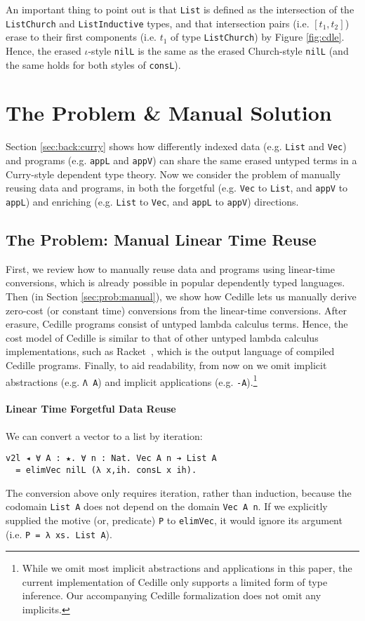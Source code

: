 \documentclass[acmsmall]{acmart}\settopmatter{}
\newcommand{\refsec}[1]{Section \ref{sec:#1}}
\newcommand{\labsec}[1]{\label{sec:#1}}
\newcommand{\reffig}[1]{Figure \ref{fig:#1}}
\begin{document}
An important thing to point out is that \verb;List; is
defined as the intersection of the \verb;ListChurch; and
\verb;ListInductive; types, and that intersection pairs (i.e. $[t_1,t_2]$) erase to their
first components (i.e. $t_1$ of type \verb;ListChurch;) by \reffig{cdle}.
Hence, the erased $\iota$-style \verb;nilL; is the same as the erased
Church-style \verb;nilL; (and the same holds for both styles of
\verb;consL;).

\section{The Problem \& Manual Solution}
\labsec{prob}

\refsec{back:curry} shows how differently indexed data
(e.g. \verb;List; and \verb;Vec;) and programs
(e.g. \verb;appL; and \verb;appV;) can share the same erased
untyped terms in a Curry-style dependent type theory. 
Now we consider the problem of manually reusing data and programs,
in both the forgetful (e.g. \verb;Vec; to \verb;List;, and
\verb;appV; to \verb;appL;) and enriching
(e.g. \verb;List; to \verb;Vec;, and
\verb;appL; to \verb;appV;) directions.

\subsection{The Problem: Manual Linear Time Reuse}
\labsec{prob:linear}

First, we review how to manually reuse data and programs using
linear-time conversions, which is already possible in popular dependently
typed languages. Then (in \refsec{prob:manual}),
we show how Cedille lets us manually derive
zero-cost (or constant time) conversions from the linear-time
conversions. 
After erasure, Cedille programs consist of untyped
lambda calculus terms. Hence, the cost model of Cedille is similar to
that of other untyped lambda calculus implementations, such as
Racket~\cite{lang:racket}, which is the output language of compiled
Cedille programs.
Finally, to aid readability, from now on we omit implicit
abstractions (e.g. \verb;Λ A;) and implicit applications
(e.g. \verb;-A;).\footnote{
  While we omit most implicit abstractions and applications in this
  paper, the current implementation of Cedille only supports a limited
  form of type inference. Our accompanying Cedille formalization does
  not omit any implicits.
  }

\paragraph{Linear Time Forgetful Data Reuse}
We can convert a vector to a list by iteration:
\begin{verbatim}
v2l ◂ ∀ A : ★. ∀ n : Nat. Vec A n ➔ List A
  = elimVec nilL (λ x,ih. consL x ih).
\end{verbatim}
The conversion above only requires iteration, rather than induction,
because the codomain \verb;List A; does not depend on the domain
\verb;Vec A n;. If we explicitly supplied the motive (or, predicate)
\verb;P; to \verb;elimVec;, it would ignore its argument
(i.e. \verb;P = λ xs. List A;).
\end{document}
